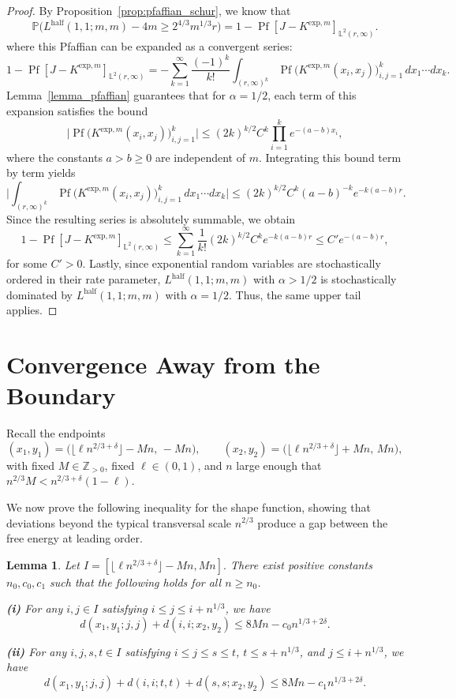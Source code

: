 \documentclass[11pt]{article}
\newtheorem{lemma}[theorem]{Lemma}
\theoremstyle{definition}
\newcommand{\Prob}{\mathbb{P}}
\newcommand{\Lhalf}{L^{\mathrm{half}}}
\begin{document}
\begin{proof}
By Proposition~\ref{prop:pfaffian_schur}, we know that
\[
\Prob\big(\Lhalf(1,1;m,m) - 4m \geq 2^{4/3}m^{1/3} r\big)
= 1- \operatorname{Pf}[J - K^{\mathrm{exp},m}]_{\mathbb{L}^2(r,\infty)}.
\]
where this Pfaffian can be expanded as a convergent series:
\[
1 - \operatorname{Pf}[J - K^{\mathrm{exp},m}]_{\mathbb{L}^2(r,\infty)}
= -\sum_{k=1}^{\infty} \frac{(-1)^k}{k!}
\int_{(r,\infty)^k} 
\operatorname{Pf}\!\big(K^{\mathrm{exp},m}(x_i,x_j)\big)_{i,j=1}^{k}
\, dx_1 \cdots dx_k.
\]
Lemma~\ref{lemma_pfaffian} guarantees that for $\alpha = 1/2$, each term of this expansion satisfies the bound
\[
\Big|
\operatorname{Pf}\!\big(K^{\mathrm{exp},m}(x_i,x_j)\big)_{i,j=1}^{k}
\Big|
\le (2k)^{k/2} C^k \prod_{i=1}^{k} e^{-(a-b)x_i},
\]
where the constants $a > b \ge 0$ are independent of $m$. Integrating this bound term by term yields
\[
\Big|
\int_{(r,\infty)^k} 
\operatorname{Pf}\!\big(K^{\mathrm{exp},m}(x_i,x_j)\big)_{i,j=1}^{k}
\, dx_1 \cdots dx_k
\Big|
\le (2k)^{k/2} C^k (a-b)^{-k} e^{-k(a-b)r}.
\]
Since the resulting series is absolutely summable, we obtain
\[
1 - \operatorname{Pf}[J - K^{\mathrm{exp},m}]_{\mathbb{L}^2(r,\infty)}
\le \sum_{k=1}^{\infty} \frac{1}{k!} (2k)^{k/2} C^k e^{-k(a-b)r}
\le C'e^{-(a-b)r},
\]
for some $C'>0$. Lastly, since exponential random variables are stochastically ordered in their rate
parameter, $\Lhalf(1,1;m,m)$ with $\alpha > 1/2$ is stochastically dominated by $\Lhalf(1,1;m,m)$ with $\alpha = 1/2$. Thus, the same upper tail applies.
\end{proof}

\section{Convergence Away from the Boundary}
\label{sec:mainproof}

Recall the endpoints
\[
(x_1,y_1)=\big(\lfloor \ell n^{2/3+\delta}\rfloor-Mn,\,-Mn\big),\qquad
(x_2,y_2)=\big(\lfloor \ell n^{2/3+\delta}\rfloor+Mn,\,Mn\big),
\]
with fixed $M\in\mathbb Z_{>0}$, fixed $\ell\in(0,1)$, and $n$ large
enough that $n^{2/3}M<n^{2/3+\delta}(1-\ell)$.


We now prove the following inequality for the shape function, showing that deviations beyond the typical transversal scale $n^{2/3}$ produce a gap between the free energy at leading order.
\begin{lemma}\label{lem:diag-deficit}
Let $I = [ \lfloor \ell n^{2/3+\delta} \rfloor -Mn,Mn].$ There exist positive constants $n_0, c_0, c_1$ such that the following holds for all $n \geq n_0$.

\textbf{(i)}
For any $i,j\in I$ satisfying $i\le j\le i+ n^{1/3}$, we have
\begin{equation}
d(x_1,y_1;j,j)+d(i,i;x_2,y_2)
\le 8Mn - c_0 n^{1/3+2\delta}.
\end{equation}

\textbf{(ii)}
For any $i,j,s,t\in I$ satisfying $i \leq j\le s\le t$, $t \leq s+ n^{1/3}$, and $j \leq i+ n^{1/3}$, we have
\begin{equation}\label{eq:hs}
d(x_1,y_1;j,j)+d(i,i;t,t)+d(s,s;x_2,y_2)
\le 8Mn - c_1 n^{1/3+2\delta}.
\end{equation}
\end{lemma}
\end{document}
